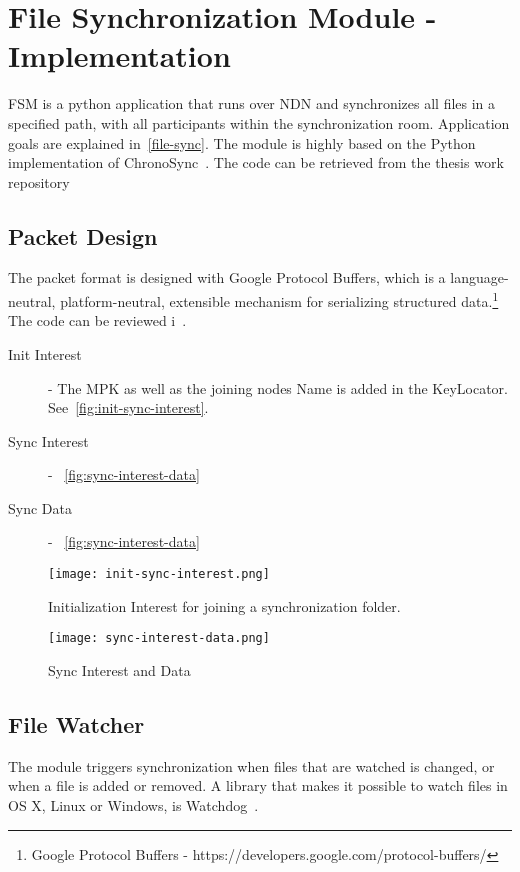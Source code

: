 \section{File Synchronization Module - Implementation}
\gls{FSM} is a python application that runs over \gls{NDN} and synchronizes all files in a specified path, with all participants within the synchronization room.
Application goals are explained in~\autoref{file-sync}.
The module is highly based on the Python implementation of ChronoSync~\cite[test-chrono-chat.py]{pyndn2-git}.
The code can be retrieved from the thesis work repository~\cite[fileSync.py]{garseg15}

\subsection{Packet Design}
The packet format is designed with Google Protocol Buffers, which is a language-neutral, platform-neutral, extensible mechanism for serializing structured data.\footnote{Google Protocol Buffers - https://developers.google.com/protocol-buffers/}
The code can be reviewed i~\cite[fileSyncBuf.proto]{garseg15}.

\begin{description}
  \item[Init Interest] - 
  The \gls{MPK} as well as the joining nodes Name is added in the KeyLocator. See~\autoref{fig:init-sync-interest}.
  \item[Sync Interest] -
  ~\autoref{fig:sync-interest-data}
  \item[Sync Data] - 
  ~\autoref{fig:sync-interest-data}
\end{description}

\begin{figure}[ht]
  \centering
  \texttt{[image: init-sync-interest.png]}
  \caption{Initialization Interest for joining a synchronization folder.}
  \label{fig:init-sync-interest}
\end{figure}

\begin{figure}[ht]
  \centering
  \texttt{[image: sync-interest-data.png]}
  \caption{Sync Interest and Data}
  \label{fig:sync-interest-data}
\end{figure}

\subsection{File Watcher}
The module triggers synchronization when files that are watched is changed, or when a file is added or removed.
A library that makes it possible to watch files in OS X, Linux or Windows, is Watchdog~\cite{watchdog}. 

